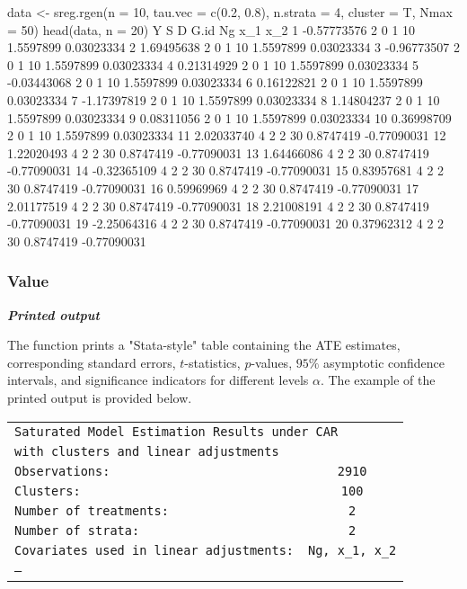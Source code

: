 \documentclass{article}
\begin{document}
\begin{rcode}
data <- sreg.rgen(n = 10, tau.vec = c(0.2, 0.8), 
		  n.strata = 4, cluster = T, Nmax = 50)
head(data, n = 20)
             Y S D G.id Ng       x_1         x_2
1  -0.57773576 2 0    1 10 1.5597899  0.03023334
2   1.69495638 2 0    1 10 1.5597899  0.03023334
3  -0.96773507 2 0    1 10 1.5597899  0.03023334
4   0.21314929 2 0    1 10 1.5597899  0.03023334
5  -0.03443068 2 0    1 10 1.5597899  0.03023334
6   0.16122821 2 0    1 10 1.5597899  0.03023334
7  -1.17397819 2 0    1 10 1.5597899  0.03023334
8   1.14804237 2 0    1 10 1.5597899  0.03023334
9   0.08311056 2 0    1 10 1.5597899  0.03023334
10  0.36998709 2 0    1 10 1.5597899  0.03023334
11  2.02033740 4 2    2 30 0.8747419 -0.77090031
12  1.22020493 4 2    2 30 0.8747419 -0.77090031
13  1.64466086 4 2    2 30 0.8747419 -0.77090031
14 -0.32365109 4 2    2 30 0.8747419 -0.77090031
15  0.83957681 4 2    2 30 0.8747419 -0.77090031
16  0.59969969 4 2    2 30 0.8747419 -0.77090031
17  2.01177519 4 2    2 30 0.8747419 -0.77090031
18  2.21008191 4 2    2 30 0.8747419 -0.77090031
19 -2.25064316 4 2    2 30 0.8747419 -0.77090031
20  0.37962312 4 2    2 30 0.8747419 -0.77090031
\end{rcode}	

\subsubsection*{Value}
\noindent \textit{\textbf{Printed output}}

The function prints a "Stata-style" table containing the ATE estimates, corresponding standard errors, $t$-statistics, $p$-values, $95\%$ asymptotic confidence intervals, and significance indicators for different levels $\alpha$. The example of the printed output is provided below.


\begin{flushleft}
\begin{tabular}{lc}
\multicolumn{2}{l}{\texttt{Saturated Model Estimation Results under CAR}} \\
\multicolumn{2}{l}{\texttt{with clusters and linear adjustments}} \\
\texttt{Observations:} & \texttt{2910} \\
\texttt{Clusters:} & \texttt{100} \\
\texttt{Number of treatments:} & \texttt{2} \\
\texttt{Number of strata:} & \texttt{2} \\
\texttt{Covariates used in linear adjustments:} & \texttt{Ng, x\_1, x\_2} \\
\texttt{---} \\
\end{tabular}
\end{flushleft}
\end{document}
